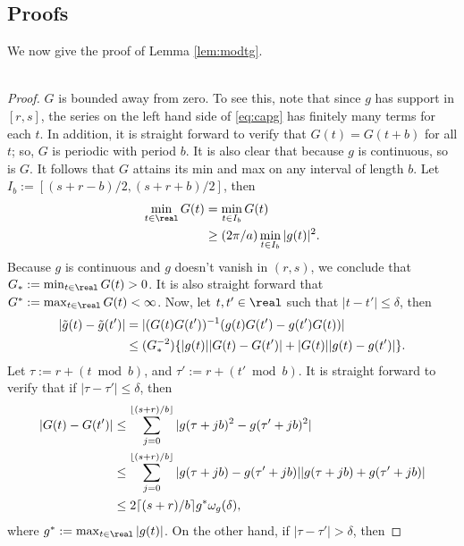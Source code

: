 \begin{appendices}
  \chapter{Proofs}\label{ap:proof}
  We now give the proof of Lemma \eqref{lem:modtg}. \\ \\
  \begin{proof}
   $G$ is bounded away from zero. To see this, note that since $g$ has support in  $[r,s]$, the series on the left hand side of \eqref{eq:capg} has finitely many terms for each $t$.  In addition, it is straight forward to verify that $G(t) = G(t+b)$ for all $t$; so,  $G$ is periodic with period $b$. It is also clear that because $g$ is continuous, so is $G$. It follows that $G$ attains its min and max on any interval of length $b$. Let $I_b := [(s+r -b)/2, (s+r +b)/2]$, then
  \begin{align}
    \min_{t\in\real} G(t) &=  \min_{t \in I_b} G(t) \notag\\
    & \ge (2\pi/a) \min_{t \in I_b}\vert g(t)\vert^2.\notag
    \label{}
  \end{align}  
  Because $g$ is continuous and $g$ doesn't vanish in $(r,s)$, we conclude that $G_*:=\min_{t \in \real}G(t) > 0$. It is also straight forward that $G^* := \max_{t \in \real}G(t) < \infty$. Now, let $t, t' \in \real$ such that $\vert t - t' \vert \le \delta$, then 
  \begin{align}
    \vert \tilde{g}(t) - \tilde{g}(t')\vert & = \vert (G(t)G(t'))^{-1}(g(t)G(t') - g(t')G(t))\vert  \notag\\
    & \le (G_*^{-2})\{\vert g(t)\vert \vert G(t) - G(t') \vert + \vert G(t)\vert \vert g(t) - g(t')\vert\}. 
    \label{eq:difftg}
  \end{align}
Let $\tau := r +  (t \bmod {b})$, and $\tau':=r + (t' \bmod{b})$. It is straight forward to verify that if  $\vert \tau - \tau' \vert \le \delta$, then
\begin{align}
  \vert G(t) - G(t') \vert & \le  \sum_{j = 0}^{\lfloor (s + r)/b \rfloor} \vert g(\tau + j b)^2 - g(\tau' + j b)^2\vert\notag\\
  & \le \sum_{j = 0}^{\lfloor (s + r)/b \rfloor} \vert g(\tau + j b) - g(\tau' + j b) \vert \vert g(\tau + j b) + g(\tau' + j b)\vert\notag\\
  & \le 2 \lceil (s + r)/b\rceil g^*\omega_g(\delta),
  \label{}
\end{align}
where $g^* := \max_{t \in \real} \vert g(t)\vert $. On the other hand, if $\vert \tau - \tau'\vert > \delta$, then 

\end{proof}
\end{appendices}
